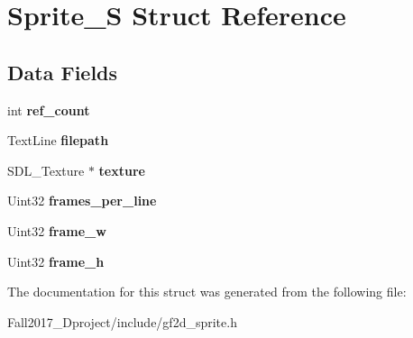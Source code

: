 \hypertarget{struct_sprite___s}{}\section{Sprite\+\_\+S Struct Reference}
\label{struct_sprite___s}
\subsection*{Data Fields}
\begin{DoxyCompactItemize}
\item 
\mbox{\label{struct_sprite___s_a223a278e0bf3b42ae887efe07bfbeac0}} 
int {\bfseries ref\+\_\+count}
\item 
\mbox{\label{struct_sprite___s_aa46214e506fc1ef9236b3fe0e4e41a0a}} 
Text\+Line {\bfseries filepath}
\item 
\mbox{\label{struct_sprite___s_a859b8efbf9abe8e82757ee5c75a0c97c}} 
S\+D\+L\+\_\+\+Texture $\ast$ {\bfseries texture}
\item 
\mbox{\label{struct_sprite___s_a19843a4e1d9b3143959c79e7eca1aa22}} 
Uint32 {\bfseries frames\+\_\+per\+\_\+line}
\item 
\mbox{\label{struct_sprite___s_aa48f01e42f02ba2e317d7fd0b2a7e466}} 
Uint32 {\bfseries frame\+\_\+w}
\item 
\mbox{\label{struct_sprite___s_ad025fb89dae766e4967a233dbfd03759}} 
Uint32 {\bfseries frame\+\_\+h}
\end{DoxyCompactItemize}


The documentation for this struct was generated from the following file\+:\begin{DoxyCompactItemize}
\item 
Fall2017\+\_\+Dproject/include/gf2d\+\_\+sprite.\+h\end{DoxyCompactItemize}
